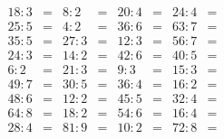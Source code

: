 \documentclass[14pt, a4paper]{extarticle}
\begin{document}
\begin{align*}
18:3&= & 8:2&= & 20:4&= & 24:4&=\\
25:5&= & 4:2&= & 36:6&= & 63:7&=\\
35:5&= & 27:3&= & 12:3&= & 56:7&=\\
24:3&= & 14:2&= & 42:6&= & 40:5&=\\
6:2&= & 21:3&= & 9:3&= & 15:3&=\\
49:7&= & 30:5&= & 36:4&= & 16:2&=\\
48:6&= & 12:2&= & 45:5&= & 32:4&=\\
64:8&= & 18:2&= & 54:6&= & 16:4&=\\
28:4&= & 81:9&= & 10:2&= & 72:8&=
\end{align*}
\end{document}
